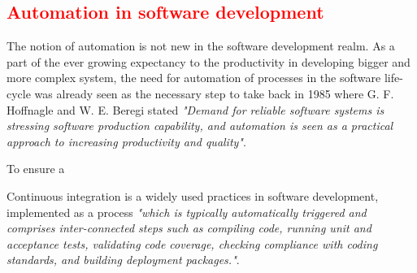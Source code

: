 \subsection{\textcolor{red}{Automation in software development}}

The notion of automation is not new in the software development realm. As a part of the ever growing expectancy to the productivity in developing bigger and more complex system, the need for automation of processes in the software life-cycle was already seen as the necessary step to take back in 1985 where G. F. Hoffnagle and W. E. Beregi stated \textit{"Demand for reliable software systems is stressing software production capability, and automation is seen as a practical approach to increasing productivity and quality"}.


To ensure a 

Continuous integration is a widely used practices in software development, implemented as a process \textit{"which is typically automatically triggered and comprises inter-connected steps such as compiling code, running unit and acceptance tests, validating code coverage, checking compliance with coding standards, and building deployment packages."}\cite{FITZGERALD2017176}. 